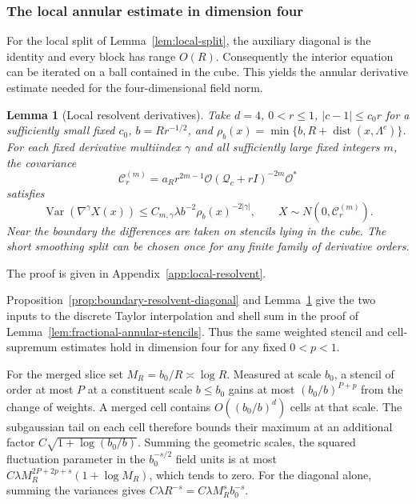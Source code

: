 \documentclass[11pt]{article}
\newtheorem{lemma}[theorem]{Lemma}
\theoremstyle{definition}
\begin{document}
\subsubsection{The local annular estimate in dimension four}
\label{subsec:local-annulus}

For the local split of Lemma~\ref{lem:local-split}, the auxiliary
diagonal is the identity and every block has range \(O(R)\).
Consequently the interior equation can be iterated on a ball
contained in the cube. This yields the annular derivative estimate
needed for the four-dimensional field norm.

\begin{lemma}[Local resolvent derivatives]\label{lem:local-annulus}
Take \(d=4\), \(0<r\le1\), \(|c-1|\le c_0r\) for a sufficiently
small fixed \(c_0\), \(b=Rr^{-1/2}\), and
\(\rho_b(x)=\min\{b,R+\operatorname{dist}(x,\Lambda^c)\}\).
For each fixed derivative multiindex \(\gamma\) and all sufficiently
large fixed integers \(m\), the covariance
\begin{equation}
 \mathcal C_r^{(m)}
 =a_Rr^{2m-1}\mathcal O(\mathcal Q_c+rI)^{-2m}\mathcal O^*
\end{equation}
satisfies
\begin{equation}
 \operatorname{Var}(\nabla^\gamma X(x))
 \le C_{m,\gamma}\lambda b^{-2}\rho_b(x)^{-2|\gamma|},
 \qquad X\sim N(0,\mathcal C_r^{(m)}).
\end{equation}
Near the boundary the differences are taken on stencils lying in
the cube. The short smoothing split can be chosen once for any
finite family of derivative orders.
\end{lemma}

The proof is given in Appendix~\ref{app:local-resolvent}.

Proposition~\ref{prop:boundary-resolvent-diagonal} and
Lemma~\ref{lem:local-annulus} give the two inputs to the discrete
Taylor interpolation and shell sum in the proof of
Lemma~\ref{lem:fractional-annular-stencils}. Thus the same weighted
stencil and cell-supremum estimates hold in dimension four for
any fixed \(0<p<1\).

For the merged slice set \(M_R=b_0/R\asymp\log R\). Measured at
scale \(b_0\), a stencil of order at most \(P\) at a constituent
scale \(b\le b_0\) gains at most \((b_0/b)^{P+p}\) from the change
of weights. A merged cell contains \(O((b_0/b)^d)\) cells at that
scale. The subgaussian tail on each cell therefore bounds their
maximum at an additional factor \(C\sqrt{1+\log(b_0/b)}\).
Summing the geometric scales, the squared fluctuation parameter in
the \(b_0^{-s/2}\) field units is at most
\(C\lambda M_R^{2P+2p+s}(1+\log M_R)\), which tends to zero.
For the diagonal alone, summing the variances gives
\(C\lambda R^{-s}=C\lambda M_R^s b_0^{-s}\).
\end{document}
